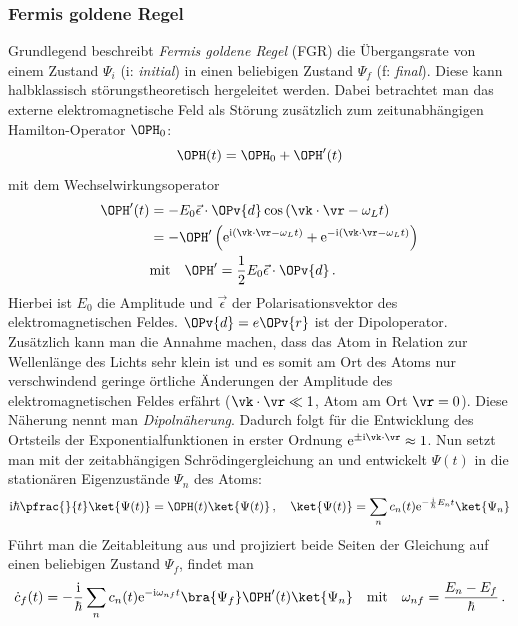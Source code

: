 \subsubsection{Fermis goldene Regel}\label{subsubsec:fermis_goldene_regel}
Grundlegend beschreibt \textit{Fermis goldene Regel} (FGR) die
Übergangsrate von einem Zustand $\Psi_i$ (i: \textit{initial}) in einen
beliebigen Zustand $\Psi_f$ (f: \textit{final}). Diese kann halbklassisch
störungstheoretisch hergeleitet werden.  Dabei betrachtet man das externe elektromagnetische Feld als Störung
zusätzlich zum zeitunabhängigen Hamilton-Operator $\OPH_0$:
\begin{equation}\label{eq:hamilton}
	\OPH(t)=\OPH_0+\OPH'(t)
\end{equation}
mit dem Wechselwirkungsoperator
\begin{equation}\label{eq:ww}
	\begin{split}
		\OPH'(t) &= -E_0\vec{\epsilon}\cdot\OPv{d}\cos{(\vk\cdot\vr-\omega_L t)}\\
		&=
		-\OPH'\left(\mathrm{e}^{\mathrm{i}(\vk\cdot\vr-\omega_L
		t)}+\mathrm{e}^{-\mathrm{i}(\vk\cdot\vr-\omega_L t)}\right)\\
		&\text{mit}\quad
		\OPH'=\frac{1}{2}E_0\vec{\epsilon}\cdot\OPv{d}\,.
	\end{split}
\end{equation}
Hierbei ist $E_0$ die Amplitude und $\vec{\epsilon}$ der
Polarisationsvektor des elektromagnetischen Feldes. $\OPv{d} = e\OPv{r}$ ist
der Dipoloperator. Zusätzlich kann man die Annahme machen, dass das Atom in Relation zur
Wellenlänge des Lichts sehr klein ist und es somit am Ort
des Atoms nur verschwindend geringe örtliche Änderungen der Amplitude des
elektromagnetischen Feldes erfährt ($\vk\cdot\vr\ll 1$, Atom am Ort $\vr=0$). Diese Näherung nennt man
\textit{Dipolnäherung}. Dadurch folgt für die Entwicklung des
Ortsteils der Exponentialfunktionen in erster Ordnung
$\mathrm{e}^{\pm\mathrm{i}\vk\cdot\vr}\approx1$. Nun setzt man mit der zeitabhängigen Schrödingergleichung an und entwickelt $\Psi(t)$ in die stationären Eigenzustände $\Psi_n$ des Atoms:
\begin{equation}\label{eq:sgl_stoerung_01}
	\mathrm{i}\hbar\pfrac{}{t}\ket{\Psi(t)}=\OPH(t)\ket{\Psi(t)}\,,
	\quad
	\ket{\Psi(t)}=\sum\limits_n{c_n(t)\mathrm{e}^{-\frac{\mathrm{i}}{\hbar} E_n
	t}\ket{\Psi_n}}
\end{equation}
Führt man die Zeitableitung aus und projiziert beide Seiten der Gleichung auf
einen beliebigen Zustand $\Psi_f$, findet man
\begin{equation}\label{eq:sgl_stoerung_02}
	\dot
	c_f(t)=-\frac{\mathrm{i}}{\hbar}\sum\limits_n{c_n(t)\mathrm{e}^{-\mathrm{i}\omega_{nf}t}\bra{\Psi_f}\OPH'(t)\ket{\Psi_n}}
	\quad\text{mit}\quad
	\omega_{nf}=\frac{E_n-E_f}{\hbar}\,.
\end{equation}
